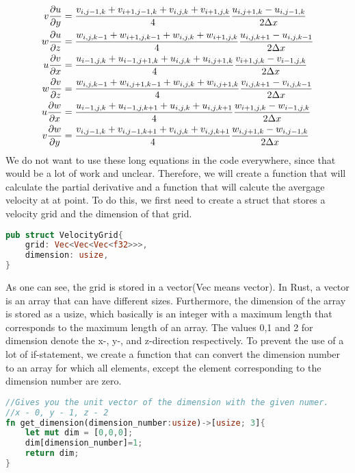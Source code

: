 \documentclass{article}
\begin{document}
\[\begin{split}
  v\pdv{u}{y}&=\frac{v_{i,j-1,k}+v_{i+1,j-1,k}+v_{i,j,k}+v_{i+1,j,k}}{4}\frac{u_{i,j+1,k}-u_{i,j-1,k}}{2\Delta x}\\
  w\pdv{u}{z}&=\frac{w_{i,j,k-1}+w_{i+1,j,k-1}+w_{i,j,k}+w_{i+1,j,k}}{4}\frac{u_{i,j,k+1}-u_{i,j,k-1}}{2\Delta x}\\
  u\pdv{v}{x}&=\frac{u_{i-1,j,k}+u_{i-1,j+1,k}+u_{i,j,k}+u_{i,j+1,k}}{4}\frac{v_{i+1,j,k}-v_{i-1,j,k}}{2\Delta x}\\
  w\pdv{v}{z}&=\frac{w_{i,j,k-1}+w_{i,j+1,k-1}+w_{i,j,k}+w_{i,j+1,k}}{4}\frac{v_{i,j,k+1}-v_{i,j,k-1}}{2\Delta x}\\
  u\pdv{w}{x}&=\frac{u_{i-1,j,k}+u_{i-1,j,k+1}+u_{i,j,k}+u_{i,j,k+1}}{4}\frac{w_{i+1,j,k}-w_{i-1,j,k}}{2\Delta x}\\
  v\pdv{w}{y}&=\frac{v_{i,j-1,k}+v_{i,j-1,k+1}+v_{i,j,k}+v_{i,j,k+1}}{4}\frac{w_{i,j+1,k}-w_{i,j-1,k}}{2\Delta x}\\
\end{split}
\] \label{average and partial}
We do not want to use these long equations in the code everywhere, since that would be a lot of work and unclear. Therefore, we will create a function that will calculate the partial derivative and a function that will calcute the avergage velocity at at point. To do this, we first need to create a struct that stores a velocity grid and the dimension of that grid.

\begin{lstlisting}[language=Rust, style=boxed, breaklines=true]
pub struct VelocityGrid{
    grid: Vec<Vec<Vec<f32>>>,
    dimension: usize,
}
\end{lstlisting}
As one can see, the grid is stored in a vector(Vec means vector). In Rust, a vector is an array that can have different sizes. Furthermore, the dimension of the array is stored as a usize, which basically is an integer with a maximum length that corresponds to the maximum length of an array. The values 0,1 and 2 for dimension denote the x-, y-, and z-direction respectively. To prevent the use of a lot of if-statement, we create a function that can convert the dimension number to an array for which all elements, except the element corresponding to the dimension number are zero. 
\begin{lstlisting}[language=Rust, style=boxed, breaklines=true]
//Gives you the unit vector of the dimension with the given numer.
//x - 0, y - 1, z - 2
fn get_dimension(dimension_number:usize)->[usize; 3]{
    let mut dim = [0,0,0];
    dim[dimension_number]=1;
    return dim;
}
\end{lstlisting}
\end{document}
